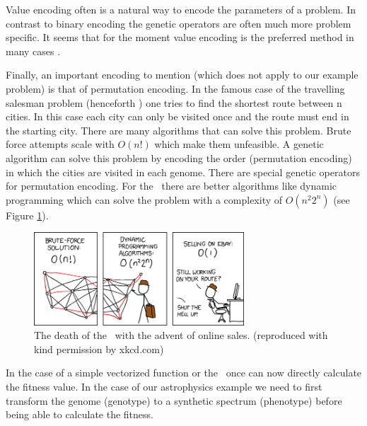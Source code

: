 Value encoding often is a natural way to encode the parameters of a problem. In contrast to binary encoding the genetic operators are often much more problem specific. It seems that for the moment value encoding is the preferred method in many cases \citep[e.g.][]{Janikow1991Comparison,Wright91geneticalgorithms}.

Finally, an important encoding to mention (which does not apply to our example problem) is that of permutation encoding. In the famous case of the travelling salesman problem (henceforth \tsp) one tries to find the shortest route between n cities. In this case each city can only be visited once and the route must end in the starting city. There are many algorithms that can solve this problem. Brute force attempts scale with $O(n!)$ which make them unfeasible. A genetic algorithm can solve this problem by encoding the order (permutation encoding) in which the cities are visited in each genome. There are special genetic operators for permutation encoding. For the \tsp\ there are better algorithms like dynamic programming which can solve the problem with a complexity of $O(n^2 2^n)$ (see Figure \ref{fig:xkcd_tsp}).

\begin{figure}[htbp] %
   \centering
   \includegraphics[width=0.7\textwidth]{chapter_dalek/plots/travelling_salesman_problem.png} 
   \caption{The death of the \tsp\ with the advent of online sales. (reproduced with kind permission by xkcd.com)}
   \label{fig:xkcd_tsp}
\end{figure}

In the case of a simple vectorized function or the \tsp\ once can now directly calculate the fitness value. In the case of our astrophysics example we need to first transform the genome (genotype) to a synthetic spectrum (phenotype) before being able to calculate the fitness.

